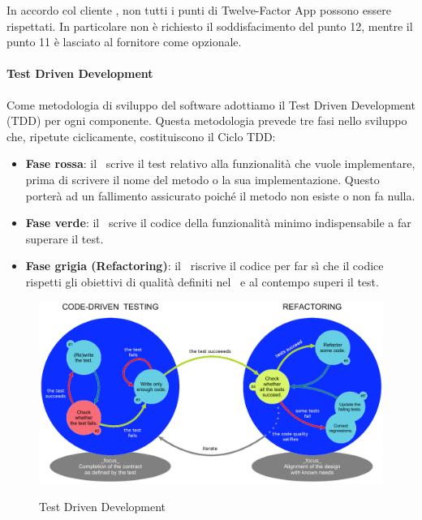 		In accordo col cliente \II, non tutti i punti di Twelve-Factor App possono essere rispettati. In particolare non è richiesto il soddisfacimento del punto 12, mentre il punto 11 è lasciato al fornitore come opzionale.

		\paragraph{Test Driven Development}\label{tdd}
		Come metodologia di sviluppo del software adottiamo il Test Driven Development (TDD) per ogni componente.
		Questa metodologia prevede tre fasi nello sviluppo che, ripetute ciclicamente, costituiscono il Ciclo TDD:
		\begin{itemize}
			\item \textbf{Fase rossa}: il \Progr\ scrive il test relativo alla funzionalità che vuole implementare, prima di scrivere
				il nome del metodo o la sua implementazione. Questo porterà ad un fallimento assicurato poiché il metodo non esiste o non fa nulla.
			\item \textbf{Fase verde}: il \Progr\ scrive il codice della funzionalità minimo indispensabile a far superare il test.
			\item \textbf{Fase grigia (Refactoring)}: il \Progr\ riscrive il codice per far sì che il codice rispetti
				gli obiettivi di qualità definiti nel \PdQd\ e al contempo superi il test.
		\end{itemize}

		\begin{figure}[H]
			\centering
			\includegraphics[width=\textwidth]{img/tdd.png}\\
			\caption[Test Driven Development]{Test Driven Development\protect\footnotemark}
		\end{figure}


